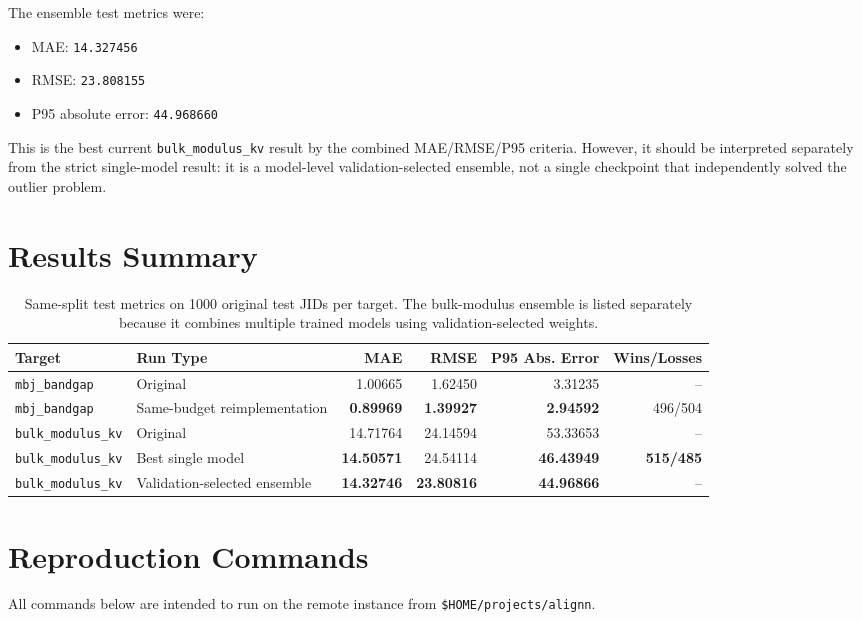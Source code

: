 \documentclass[11pt]{article}
\begin{document}
The ensemble test metrics were:
\begin{itemize}
  \item MAE: \texttt{14.327456}
  \item RMSE: \texttt{23.808155}
  \item P95 absolute error: \texttt{44.968660}
\end{itemize}

This is the best current \texttt{bulk\_modulus\_kv} result by the combined MAE/RMSE/P95 criteria.  However, it should be interpreted separately from the strict single-model result: it is a model-level validation-selected ensemble, not a single checkpoint that independently solved the outlier problem.

\section{Results Summary}

\begin{table}[h]
\centering
\begin{tabular}{llrrrr}
\toprule
Target & Run Type & MAE & RMSE & P95 Abs. Error & Wins/Losses \\
\midrule
\texttt{mbj\_bandgap} & Original & 1.00665 & 1.62450 & 3.31235 & -- \\
\texttt{mbj\_bandgap} & Same-budget reimplementation & \textbf{0.89969} & \textbf{1.39927} & \textbf{2.94592} & 496/504 \\
\texttt{bulk\_modulus\_kv} & Original & 14.71764 & 24.14594 & 53.33653 & -- \\
\texttt{bulk\_modulus\_kv} & Best single model & \textbf{14.50571} & 24.54114 & \textbf{46.43949} & \textbf{515/485} \\
\texttt{bulk\_modulus\_kv} & Validation-selected ensemble & \textbf{14.32746} & \textbf{23.80816} & \textbf{44.96866} & -- \\
\bottomrule
\end{tabular}
\caption{Same-split test metrics on 1000 original test JIDs per target.  The bulk-modulus ensemble is listed separately because it combines multiple trained models using validation-selected weights.}
\end{table}

\section{Reproduction Commands}

All commands below are intended to run on the remote instance from \texttt{\$HOME/projects/alignn}.
\end{document}
